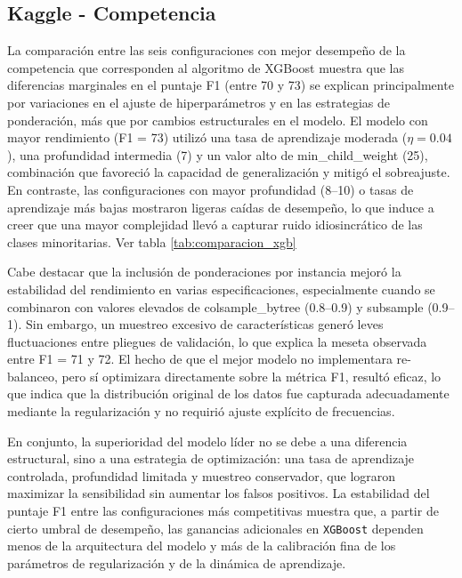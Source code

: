 

\subsection{Kaggle - Competencia}

La comparación entre las seis configuraciones con mejor desempeño de la competencia que corresponden al algoritmo de XGBoost muestra que las diferencias marginales en el puntaje F1 (entre 70 y 73) se explican principalmente por variaciones en el ajuste de hiperparámetros y en las estrategias de ponderación, más que por cambios estructurales en el modelo. El modelo con mayor rendimiento (F1 = 73) utilizó una tasa de aprendizaje moderada ($\eta = 0.04$), una profundidad intermedia (7) y un valor alto de min\_child\_weight (25), combinación que favoreció la capacidad de generalización y mitigó el sobreajuste. En contraste, las configuraciones con mayor profundidad (8--10) o tasas de aprendizaje más bajas mostraron ligeras caídas de desempeño, lo que induce a creer que una mayor complejidad llevó a capturar ruido idiosincrático de las clases minoritarias. Ver tabla \ref{tab:comparacion_xgb}

Cabe destacar que la inclusión de ponderaciones por instancia mejoró la estabilidad del rendimiento en varias especificaciones, especialmente cuando se combinaron con valores elevados de colsample\_bytree (0.8--0.9) y subsample (0.9--1). Sin embargo, un muestreo excesivo de características generó leves fluctuaciones entre pliegues de validación, lo que explica la meseta observada entre F1 = 71 y 72. El hecho de que el mejor modelo no implementara re-balanceo, pero sí optimizara directamente sobre la métrica F1, resultó eficaz, lo que indica que la distribución original de los datos fue capturada adecuadamente mediante la regularización y no requirió ajuste explícito de frecuencias.

En conjunto, la superioridad del modelo líder no se debe a una diferencia estructural, sino a una estrategia de optimización: una tasa de aprendizaje controlada, profundidad limitada y muestreo conservador, que lograron maximizar la sensibilidad sin aumentar los falsos positivos. La estabilidad del puntaje F1 entre las configuraciones más competitivas muestra que, a partir de cierto umbral de desempeño, las ganancias adicionales en \texttt{XGBoost} dependen menos de la arquitectura del modelo y más de la calibración fina de los parámetros de regularización y de la dinámica de aprendizaje.


